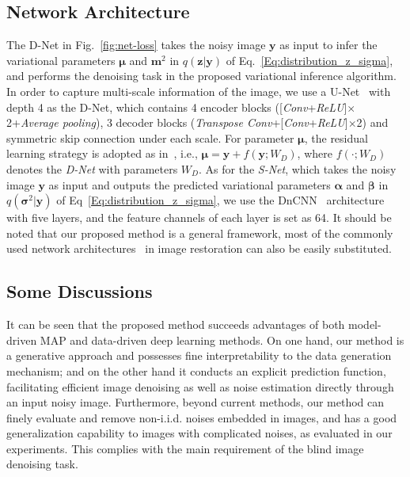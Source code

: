 \documentclass{article}
\begin{document}
\vspace{-2mm}\subsection{Network Architecture}\vspace{-2mm}
The D-Net in Fig.~\ref{fig:net-loss} takes the noisy image $\bm{y}$ as input to infer the variational
parameters $\bm{\mu}$ and $\bm{m}^2$ in $q(\bm{z}|\bm{y})$ of Eq.~\eqref{Eq:distribution_z_sigma},
and performs the denoising task in the proposed variational inference algorithm. In order to capture
multi-scale information of the image, we use a U-Net~\cite{ronneberger2015u} with depth 4 as the D-Net,
which contains 4 encoder blocks ([\textit{Conv}+\textit{ReLU}]$\times$2+\textit{Average pooling}), 3 decoder
blocks (\textit{Transpose Conv}+[\textit{Conv}+\textit{ReLU}]$\times$2) and symmetric skip connection under
each scale. For parameter $\bm{\mu}$, the residual learning strategy is adopted as in~\cite{zhang2017beyond}, i.e.,
$\bm{\mu}=\bm{y}+f(\bm{y};W_D)$, where $f( \cdot ;W_D)$ denotes the \textit{D-Net} with parameters $W_D$.
As for the \textit{S-Net}, which takes the noisy image $\bm{y}$ as input and outputs the predicted variational
parameters $\bm{\alpha}$ and $\bm{\beta}$ in $q(\bm{\sigma}^2|\bm{y})$ of Eq~\eqref{Eq:distribution_z_sigma},
we use the DnCNN~\cite{zhang2017beyond} architecture with five layers, and the feature channels of each layer
is set as 64. It should be noted that our proposed method is a general framework, most of the commonly used network
architectures~\cite{zhang2018ffdnet,Ploetz2018,lefkimmiatis2018universal,zhang2018residual} in image restoration can
also be easily substituted.

\vspace{-2mm}\subsection{Some Discussions}\label{sec:discussion}\vspace{-2mm}
It can be seen that the proposed method succeeds advantages of both model-driven MAP and data-driven deep learning methods.
On one hand, our method is a generative approach and possesses fine interpretability to the data generation mechanism;
and on the other hand it conducts an explicit prediction function, facilitating efficient image denoising as well as
noise estimation directly through an input noisy image. Furthermore, beyond current methods, our method can finely
evaluate and remove non-i.i.d. noises embedded in images, and has a good generalization capability to images with
complicated noises, as evaluated in our experiments. This complies with the main requirement of the blind image
denoising task.
\end{document}
